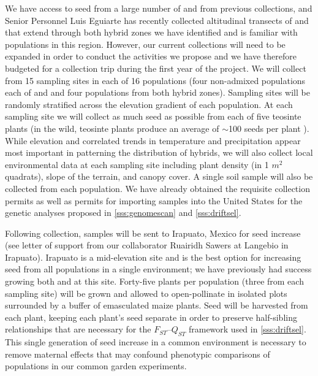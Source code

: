We have access to seed from a large number of \zm{} and \zp{} from previous collections, and Senior Personnel Luis Eguiarte has recently collected altitudinal transects of \zp{} and \zm{} that extend through both hybrid zones we have identified \citep{Diez2013} and is familiar with populations in this region.
However, our current collections will need to be expanded in order to conduct the activities we propose and we have therefore budgeted for a collection trip during the first year of the project.
We will collect from 15 sampling sites in each of 16 populations (four non-admixed populations each of \zp{} and \zm{} and four populations from both hybrid zones).
Sampling sites will be randomly stratified across the elevation gradient of each population.
At each sampling site we will collect as much seed as possible from each of five teosinte plants (in the wild, teosinte plants produce an average of $\sim$100 seeds per plant \citep{wilkes1967teosinte}). 
While elevation and correlated trends in temperature and precipitation appear most important in patterning the distribution of hybrids, we will also collect local environmental data at each sampling site including plant density (in 1 $m^2$ quadrats), slope of the terrain, and canopy cover.
A single soil sample will also be collected from each population.  
We have already obtained the requisite collection permits as well as permits for importing samples into the United States for the genetic analyses proposed in \ref{sss:genomescan} and \ref{sss:driftsel}.

Following collection, samples will be sent to Irapuato, Mexico for seed increase (see letter of support from our collaborator Ruairidh Sawers at Langebio in Irapuato).
Irapuato is a mid-elevation site and is the best option for increasing seed from all populations in a single environment; we have previously had success growing both \zp{} and \zm{} at this site. 
Forty-five plants per population (three from each sampling site) will be grown and allowed to open-pollinate in isolated plots surrounded by a buffer of emasculated maize plants.   
Seed will be harvested from each plant, keeping each plant's seed separate in order to preserve half-sibling relationships that are necessary for the $F_{ST}$--$Q_{ST}$ framework used in \ref{sss:driftsel}.
This single generation of seed increase in a common environment is necessary to remove maternal effects that may confound phenotypic comparisons of populations in our common garden experiments.

